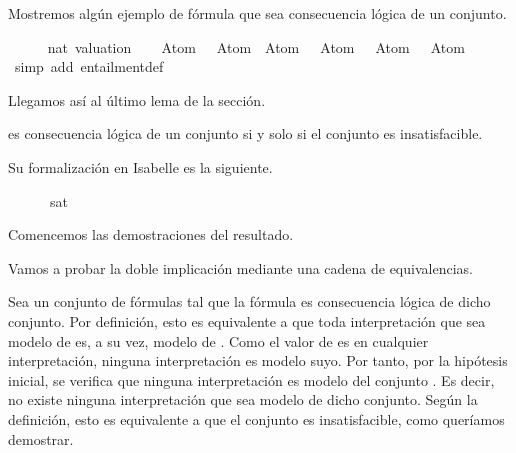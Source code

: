 \begin{isabellebody}
\begin{isamarkuptext}
  Mostremos algún ejemplo de fórmula que sea consecuencia lógica de
  un conjunto.%
\end{isamarkuptext}\isamarkuptrue%
\isamarkupfalse%
\isanewline
{}\isanewline
%
\isadelimproof
\ \ %
\endisadelimproof
%
\isatagproof
{}\isamarkupfalse%
\ {\isasymA}\ {\isacharcolon}{\isacharcolon}\ {\isachardoublequoteopen}nat\ valuation{\isachardoublequoteclose}\isanewline
\isanewline
\ \ \isamarkupfalse%
\ {\isachardoublequoteopen}{\isacharbraceleft}Atom\ {}\ \isactrlbold {\isasymrightarrow}\ Atom\ {}{\isacharcomma}\ Atom\ {}\ \isactrlbold {\isasymrightarrow}\ Atom\ {}{\isacharbraceright}\ {\isasymTTurnstile}\ {\isacharparenleft}Atom\ {}\ \isactrlbold {\isasymrightarrow}\ Atom\ {}{\isacharparenright}{\isachardoublequoteclose}\isanewline
\ \ \ \ \isamarkupfalse%
\ {\isacharparenleft}simp\ add{\isacharcolon}\ entailment{\isacharunderscore}def{\isacharparenright}%
\endisatagproof
{\isafoldproof}%
%
\isadelimproof
\isanewline
%
\endisadelimproof
\isanewline
{}\isamarkupfalse%
%
\begin{isamarkuptext}%
Llegamos así al último lema de la sección.

  \begin{lema}
    \isa{{\isasymbottom}} es consecuencia lógica de un conjunto si y solo si el conjunto
    es insatisfacible.
  \end{lema}

  Su formalización en Isabelle es la siguiente.%
\end{isamarkuptext}\isamarkuptrue%
\isamarkupfalse%
\ {\isachardoublequoteopen}{\isasymGamma}\ {\isasymTTurnstile}\ {\isasymbottom}\ {\isasymlongleftrightarrow}\ {\isasymnot}\ sat\ {\isasymGamma}{\isachardoublequoteclose}\ \isanewline
%
\isadelimproof
\ \ %
\endisadelimproof
%
\isatagproof
{}\isamarkupfalse%
%
\endisatagproof
{\isafoldproof}%
%
\isadelimproof
%
\endisadelimproof
%
\begin{isamarkuptext}%
Comencemos las demostraciones del resultado.

  \begin{demostracion}
    Vamos a probar la doble implicación mediante una cadena de
    equivalencias.

    Sea un conjunto de fórmulas \isa{{\isasymGamma}} tal que la fórmula \isa{{\isasymbottom}} es
    consecuencia lógica de dicho conjunto. Por definición, esto es
    equivalente a que toda interpretación que sea modelo de
    \isa{{\isasymGamma}} es, a su vez, modelo de \isa{{\isasymbottom}}. Como el valor de \isa{{\isasymbottom}} es  
    en cualquier interpretación, ninguna interpretación es modelo suyo. 
    Por tanto, por la hipótesis inicial, se verifica que ninguna 
    interpretación es modelo del conjunto \isa{{\isasymGamma}}. Es decir, no existe 
    ninguna interpretación que sea modelo de dicho conjunto. Según la 
    definición, esto es equivalente a que el conjunto \isa{{\isasymGamma}} es 
    insatisfacible, como queríamos demostrar.
  \end{demostracion}


\end{isamarkuptext}
\end{isabellebody}
